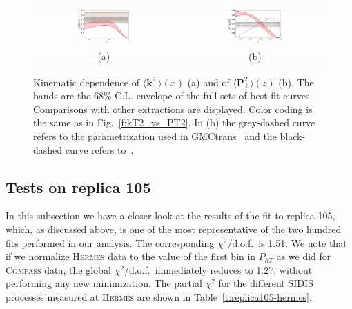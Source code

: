 \documentclass[aps,preprintnumbers,showpacs,nofootinbib,superscriptaddress,floatfix]{revtex4}
\newcommand{\hermes}{\textsc{Hermes }}
\newcommand{\compass}{\textsc{Compass }}
\newcommand{\T}{\perp}
\begin{document}
\begin{figure}[h!]
\centering
\begin{tabular}{ccc}
\includegraphics[width=0.40\textwidth]{plots/kT2av_Compare_with_other_extractions_flINDEP.pdf}
&\hspace{0.001cm}
&
\includegraphics[width=0.40\textwidth]{plots/PT2av_Compare_with_other_extractions_flINDEP.pdf}
\\
(a) && (b)
\end{tabular}
\caption{Kinematic dependence of $\big \langle \bm{k}_{\T}^2 \big \rangle (x)$ (a) and of $\big \langle \bm{P}_{\perp}^2 \big \rangle (z)$ (b). The bands are the $68\%$ C.L. envelope of the full sets of best-fit curves. Comparisons with other extractions are displayed. Color coding is the same as in Fig.~\ref{f:kT2_vs_PT2}.  In (b) the grey-dashed curve refers to the parametrization used in GMCtrans~\cite{gmctrans} and the black-dashed curve refers to~\cite{Boglione:1999pz}. }
\label{f:avmomenta_68CL}
\end{figure}


\subsection{Tests on replica 105}
\label{ss:replica105}

In this subsection we have a closer look at the results of the fit to replica 105, which, as discussed above, is one of the most representative of the two hundred fits performed in our analysis. The corresponding $\chi^2/$d.o.f.~is 1.51. We note that if we normalize \hermes data to the value of the first bin in $P_{hT}$ as we did for \compass data, the global  $\chi^2/$d.o.f.~immediately reduces to 1.27, without performing any new minimization. The partial $\chi^2$ for the different SIDIS processes measured at \hermes are shown in Table~\ref{t:replica105-hermes}.
\end{document}
